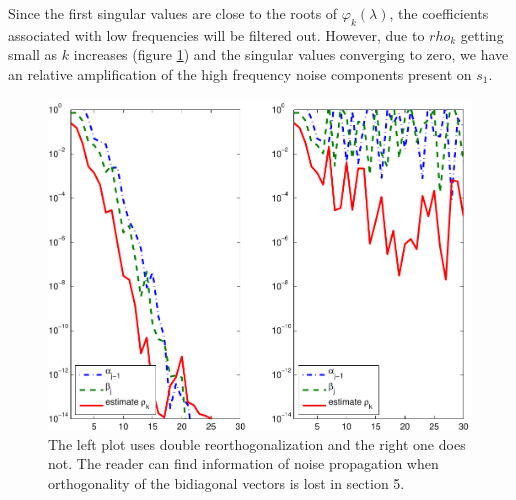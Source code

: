 \documentclass[11pt]{amsart}
\begin{document}
Since the first singular values are close to the roots of
$\varphi_{k}(\lambda)$, the coefficients associated with low frequencies will be
filtered out. However, due to $rho_{k}$ getting small as $k$ increases (figure
\ref{fig:rhok}) and the singular values converging to zero, we have an
relative amplification of the high frequency noise components present on 
$s_{1}$.
\begin{figure}[htb] \label{fig:rhok}
  \begin{center}
    \includegraphics[width=0.55\linewidth]{figures/run1/alpha_beta_est}
  \end{center}
\caption{The left plot uses double reorthogonalization and the right one does
not. The reader can find information of noise propagation when orthogonality of
the bidiagonal vectors is lost in \cite{bidiagonalization} section 5.}
\end{figure}
\end{document}

